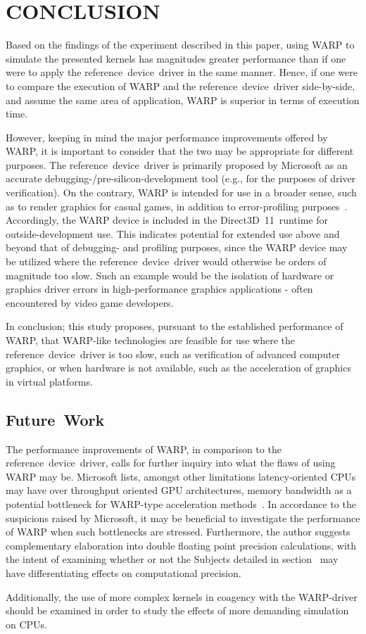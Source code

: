 
\section{CONCLUSION}
\label{sec:conclusion}
Based on the findings of the experiment described in this paper, using WARP to simulate the presented kernels has magnitudes greater performance than if one were to apply the reference~device~driver in the same manner.
Hence, if one were to compare the execution of WARP and the reference~device~driver side-by-side, and assume the same area of application, WARP is superior in terms of execution time.

However, keeping in mind the major performance improvements offered by WARP, it is important to consider that the two may be appropriate for different purposes.
The reference~device~driver is primarily proposed by Microsoft as an accurate debugging-/pre-silicon-development tool (e.g., for the purposes of driver verification).
On the contrary, WARP is intended for use in a broader sense, such as to render graphics for casual games, in addition to error-profiling purposes~.
Accordingly, the WARP device is included in the Direct3D~11~runtime for outside-development use.
This indicates potential for extended use above and beyond that of debugging- and profiling purposes, since the WARP device may be utilized where the reference~device~driver would otherwise be orders of magnitude too slow.
Such an example would be the isolation of hardware or graphics driver errors in high-performance graphics applications - often encountered by video game developers.

In conclusion; this study proposes, pursuant to the established performance of WARP, that WARP-like technologies are feasible for use where the reference~device~driver is too slow, such as verification of advanced computer graphics, or when hardware is not available, such as the acceleration of graphics in virtual platforms.

\subsection{Future~Work}
\label{sec:conclusion:futurework}
The performance improvements of WARP, in comparison to the reference~device~driver, calls for further inquiry into what the flaws of using WARP may be.
Microsoft lists, amongst other limitations latency-oriented CPUs may have over throughput oriented GPU architectures, memory bandwidth as a potential bottleneck for WARP-type acceleration methods~.
In accordance to the suspicions raised by Microsoft, it may be beneficial to investigate the performance of WARP when such bottlenecks are stressed.
Furthermore, the author suggests complementary elaboration into double floating point precision calculations, with the intent of examining whether or not the Subjects detailed in section~ may have differentiating effects on computational precision.

Additionally, the use of more complex kernels in coagency with the WARP-driver should be examined in order to study the effects of more demanding simulation on CPUs.
